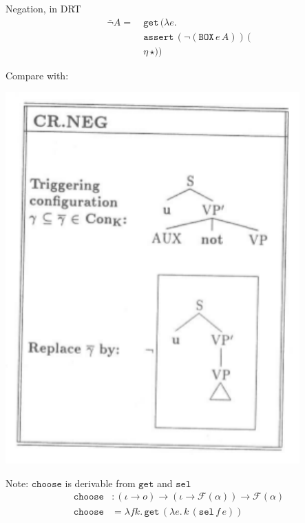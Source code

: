 \documentclass{beamer}
\newcommand{\lam}[2]{\lambda #1.\, #2}
\newcommand{\ap}[2]{#1\,#2}
\newcommand{\app}[3]{\ap{\ap{#1}{#2}}{#3}}
\newcommand{\op}[1]{\mathtt{#1}}
\newcommand{\FF}{\mathcal{F}}
\newcommand{\sel}{\texttt{sel}}
\newcommand{\boxop}{\texttt{BOX}}
\begin{document}
\begin{frame}{Negation, in DRT}
  \begin{align*}
    \bar{\lnot} A =\ & \ap{\op{get}}{(\lam{e}{ \\
                    & \app{\op{assert}}{(\lnot(\app{\boxop}{e}{A}))}{( \\
                     & \ap{\eta}{\star})}})}
  \end{align*}

  \begin{center}
  Compare with:

  \includegraphics[height=0.5\textheight]{cr-neg}
  \end{center}
\end{frame}

\begin{frame}{Note: $\op{choose}$ is derivable from $\op{get}$ and $\sel$}
  \begin{align*}
    \op{choose} &: (\iota \to o) \to (\iota \to \FF(\alpha)) \to \FF(\alpha) \\
    \op{choose} &= \lam{f k}{\ap{\op{get}}{(\lam{e}{\ap{k}{(\app{\sel}{f}{e})}})}}
  \end{align*}
\end{frame}
\end{document}
